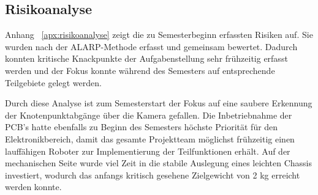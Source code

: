 \documentclass[main.tex]{subfiles} %
\begin{document}

\subsection{Risikoanalyse}

Anhang ~\ref{apx:risikoanalyse} zeigt die zu Semesterbeginn erfassten Risiken
auf. Sie wurden nach der ALARP-Methode erfasst und gemeinsam bewertet. Dadurch
konnten kritische Knackpunkte der Aufgabenstellung sehr frühzeitig erfasst
werden und der Fokus konnte während des Semesters auf entsprechende Teilgebiete
gelegt werden.

Durch diese Analyse ist zum Semesterstart der Fokus auf eine saubere Erkennung
der Knotenpunktabgänge über die Kamera gefallen. Die Inbetriebnahme der PCB's
hatte ebenfalls zu Beginn des Semesters höchste Priorität für den
Elektronikbereich, damit das gesamte Projektteam möglichst frühzeitig einen
lauffähigen Roboter zur Implementierung der Teilfunktionen erhält. Auf der
mechanischen Seite wurde viel Zeit in die stabile Auslegung eines leichten
Chassis investiert, wodurch das anfangs kritisch gesehene Zielgewicht von 2 kg
erreicht werden konnte.
\end{document}
